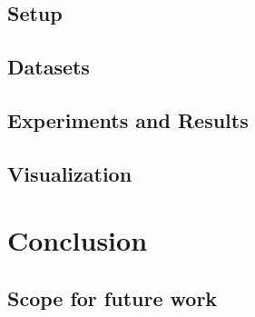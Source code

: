 \documentclass[a4paper, 12pt]{article}
\begin{document}
\subsection{Setup}
\subsection{Datasets}
\subsection{Experiments and Results}
\subsection{Visualization}
\newpage
\section{Conclusion}
\subsection{Scope for future work}
\nocite{fontaine,gao,poorzahedy2,tianze,leblanc,kuo,poorzahedy1,wen}



\end{document}
